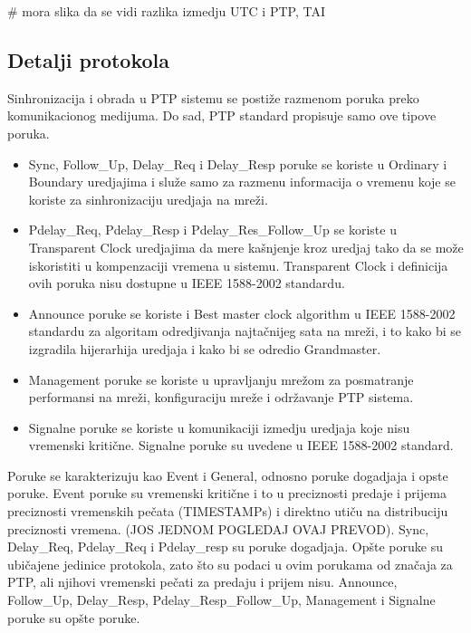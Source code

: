 \documentclass[a4paper,12pt, master]{etf}
\begin{document}
	\# mora slika da se vidi razlika izmedju UTC i PTP, TAI

    \subsection{Detalji protokola}
    
	Sinhronizacija i obrada u PTP sistemu se posti\v{z}e razmenom poruka preko komunikacionog 
	medijuma. Do sad, PTP standard propisuje samo ove tipove poruka.

    \begin{itemize}
	    \item Sync, Follow\_Up, Delay\_Req i Delay\_Resp poruke se koriste u Ordinary i Boundary 
	    uredjajima i slu\v{z}e samo za razmenu informacija o vremenu koje se koriste za 
	    sinhronizaciju uredjaja na mre\v{z}i.
	    \item Pdelay\_Req, Pdelay\_Resp i Pdelay\_Res\_Follow\_Up se koriste u Transparent Clock 
	    uredjajima da mere ka\v{s}njenje kroz uredjaj tako da se mo\v{z}e iskoristiti u kompenzaciji 
	    vremena u sistemu. Transparent Clock i definicija ovih poruka nisu dostupne u IEEE 
	    1588-2002 standardu.
	    \item Announce poruke se koriste i Best master clock algorithm u IEEE 1588-2002 standardu za
	    algoritam odredjivanja najta\v{c}nijeg sata na mre\v{z}i, i to kako bi se izgradila hijerarhija
	    uredjaja i kako bi se odredio Grandmaster.
        \item Management poruke se koriste u upravljanju mre\v{z}om za posmatranje performansi na 
        mre\v{z}i, konfiguraciju mre\v{z}e i odr\v{z}avanje PTP sistema.
	    \item Signalne poruke se koriste u komunikaciji izmedju uredjaja koje nisu vremenski kriti\v{c}ne.
        Signalne poruke su uvedene u IEEE 1588-2002 standard.
    \end{itemize}

	Poruke se karakterizuju kao Event i General, odnosno poruke dogadjaja i opste poruke. Event
	poruke su vremenski kriti\v{c}ne i to u preciznosti predaje i prijema preciznosti vremenskih 
	pe\v{c}ata (TIMESTAMPs) i direktno uti\v{c}u na distribuciju preciznosti vremena. (JOS JEDNOM 
	POGLEDAJ OVAJ PREVOD). Sync, Delay\_Req, Pdelay\_Req i Pdelay\_resp su poruke dogadjaja. 
	Op\v{s}te poruke su ubi\v{c}ajene jedinice protokola, zato \v{s}to su podaci u ovim porukama od 
	zna\v{c}aja za PTP, ali njihovi vremenski pe\v{c}ati za predaju i prijem nisu. Announce, Follow\_Up,
	Delay\_Resp, Pdelay\_Resp\_Follow\_Up, Management i Signalne poruke su op\v{s}te poruke.
\end{document}
